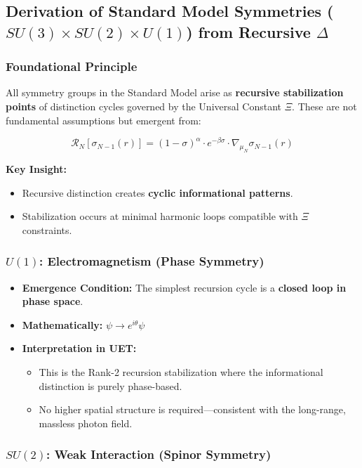 \documentclass[12pt,a4paper]{article}
\begin{document}
\subsection{Derivation of Standard Model Symmetries (\(SU(3) \times SU(2) \times U(1)\)) from Recursive \(\Delta\)}

\subsubsection*{Foundational Principle}

All symmetry groups in the Standard Model arise as \textbf{recursive stabilization points} of distinction cycles governed by the Universal Constant \(\Xi\). These are not fundamental assumptions but emergent from:

\[
\mathcal{R}_N[\sigma_{N-1}(r)] = (1 - \sigma)^\alpha \cdot e^{-\beta \sigma} \cdot \nabla_{\mu_N} \sigma_{N-1}(r)
\]

\textbf{Key Insight:}
\begin{itemize}
    \item Recursive distinction creates \textbf{cyclic informational patterns}.
    \item Stabilization occurs at minimal harmonic loops compatible with \(\Xi\) constraints.
\end{itemize}

\subsubsection*{\(U(1)\): Electromagnetism (Phase Symmetry)}

\begin{itemize}
    \item \textbf{Emergence Condition:} The simplest recursion cycle is a \textbf{closed loop in phase space}.
    \item \textbf{Mathematically:} \(\psi \to e^{i\theta} \psi\)
    \item \textbf{Interpretation in UET:} 
    \begin{itemize}
        \item This is the Rank-2 recursion stabilization where the informational distinction is purely phase-based.
        \item No higher spatial structure is required—consistent with the long-range, massless photon field.
    \end{itemize}
\end{itemize}

\subsubsection*{\(SU(2)\): Weak Interaction (Spinor Symmetry)}
\end{document}
